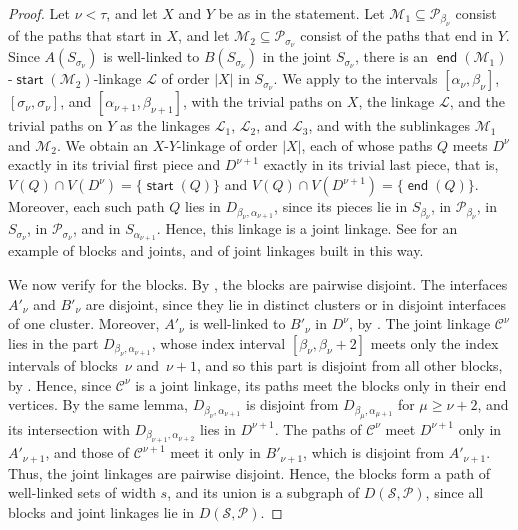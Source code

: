 \documentclass[fontsize=12pt,leading=14pt]{fullpaper}
\DeclareMathOperator{\st}{\mathsf{start}}
\DeclareMathOperator{\en}{\mathsf{end}}
\newcommand{\Ccal}{\mathcal{C}}
\newcommand{\Lcal}{\mathcal{L}}
\newcommand{\Mcal}{\mathcal{M}}
\newcommand{\Pcal}{\mathcal{P}}
\newcommand{\Scal}{\mathcal{S}}
\begin{document}
\begin{proof}
  Let $\nu<\tau$, and let $X$ and $Y$ be as in the statement.
  Let $\Mcal_1\subseteq\Pcal_{\beta_\nu}$ consist of the paths that start in $X$, and let $\Mcal_2\subseteq\Pcal_{\sigma_\nu}$ consist of the paths that end in $Y$.
  Since $A(S_{\sigma_\nu})$ is well-linked to $B(S_{\sigma_\nu})$ in the joint $S_{\sigma_\nu}$, there is an $\en(\Mcal_1)$-$\st(\Mcal_2)$-linkage $\Lcal$ of order $|X|$ in $S_{\sigma_\nu}$.
  We apply  to the intervals $[\alpha_\nu,\beta_\nu]$, $[\sigma_\nu,\sigma_\nu]$, and $[\alpha_{\nu+1},\beta_{\nu+1}]$, with the trivial paths on $X$, the linkage $\Lcal$, and the trivial paths on $Y$ as the linkages $\Lcal_1$, $\Lcal_2$, and $\Lcal_3$, and with the sublinkages $\Mcal_1$ and $\Mcal_2$.
  We obtain an $X$-$Y$-linkage of order $|X|$, each of whose paths $Q$ meets $D^\nu$ exactly in its trivial first piece and $D^{\nu+1}$ exactly in its trivial last piece, that is, $V(Q)\cap V(D^\nu)=\{\st(Q)\}$ and $V(Q)\cap V(D^{\nu+1})=\{\en(Q)\}$.
  Moreover, each such path $Q$ lies in $D_{\beta_\nu,\alpha_{\nu+1}}$, since its pieces lie in $S_{\beta_\nu}$, in $\Pcal_{\beta_\nu}$, in $S_{\sigma_\nu}$, in $\Pcal_{\sigma_\nu}$, and in $S_{\alpha_{\nu+1}}$.
  Hence, this linkage is a joint linkage.
  See  for an example of blocks and joints, and of joint linkages built in this way.

  We now verify  for the blocks.
  By , the blocks are pairwise disjoint.
  The interfaces $A'_\nu$ and $B'_\nu$ are disjoint, since they lie in distinct clusters or in disjoint interfaces of one cluster.
  Moreover, $A'_\nu$ is well-linked to $B'_\nu$ in $D^\nu$, by .
  The joint linkage $\Ccal^\nu$ lies in the part $D_{\beta_\nu,\alpha_{\nu+1}}$, whose index interval $[\beta_\nu,\beta_\nu+2]$ meets only the index intervals of blocks~$\nu$ and~$\nu+1$, and so this part is disjoint from all other blocks, by .
  Hence, since $\Ccal^\nu$ is a joint linkage, its paths meet the blocks only in their end vertices.
  By the same lemma, $D_{\beta_\nu,\alpha_{\nu+1}}$ is disjoint from $D_{\beta_\mu,\alpha_{\mu+1}}$ for $\mu\ge\nu+2$, and its intersection with $D_{\beta_{\nu+1},\alpha_{\nu+2}}$ lies in $D^{\nu+1}$.
  The paths of $\Ccal^\nu$ meet $D^{\nu+1}$ only in $A'_{\nu+1}$, and those of $\Ccal^{\nu+1}$ meet it only in $B'_{\nu+1}$, which is disjoint from $A'_{\nu+1}$.
  Thus, the joint linkages are pairwise disjoint.
  Hence, the blocks form a path of well-linked sets of width $s$, and its union is a subgraph of $D(\Scal,\Pcal)$, since all blocks and joint linkages lie in $D(\Scal,\Pcal)$.
\end{proof}
\end{document}
